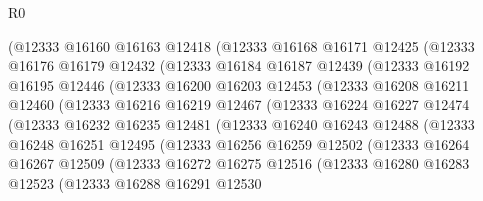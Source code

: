 \begin{lexlean}{R0}
\begin{coremodule}
              (@12333
                @16160
                @16163
                @12418
                (@12333
                  @16168
                  @16171
                  @12425
                  (@12333
                    @16176
                    @16179
                    @12432
                    (@12333
                      @16184
                      @16187
                      @12439
                      (@12333
                        @16192
                        @16195
                        @12446
                        (@12333
                          @16200
                          @16203
                          @12453
                          (@12333
                            @16208
                            @16211
                            @12460
                            (@12333
                              @16216
                              @16219
                              @12467
                              (@12333
                                @16224
                                @16227
                                @12474
                                (@12333
                                  @16232
                                  @16235
                                  @12481
                                  (@12333
                                    @16240
                                    @16243
                                    @12488
                                    (@12333
                                      @16248
                                      @16251
                                      @12495
                                      (@12333
                                        @16256
                                        @16259
                                        @12502
                                        (@12333
                                          @16264
                                          @16267
                                          @12509
                                          (@12333
                                            @16272
                                            @16275
                                            @12516
                                            (@12333
                                              @16280
                                              @16283
                                              @12523
                                              (@12333
                                                @16288
                                                @16291
                                                @12530

\end{coremodule}
\end{lexlean}
